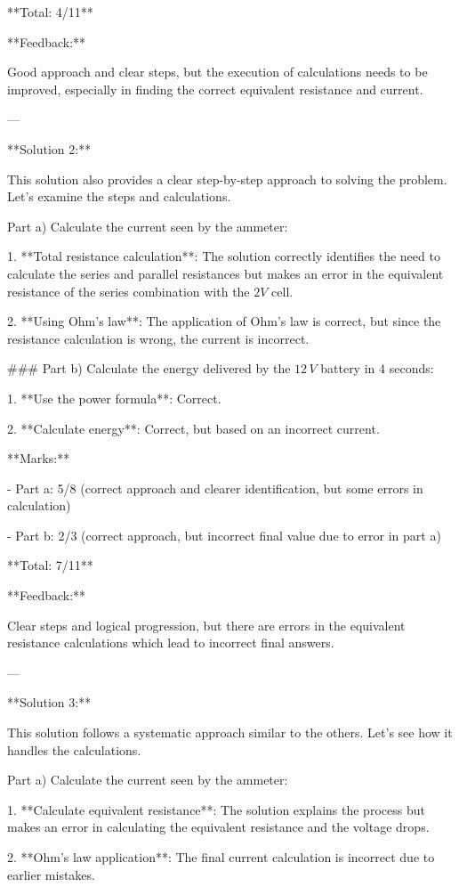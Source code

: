 \documentclass[a4paper,11pt]{article}
\begin{document}
**Total: 4/11**

**Feedback:**

Good approach and clear steps, but the execution of calculations needs to be improved, especially in finding the correct equivalent resistance and current.

---

**Solution 2:**

This solution also provides a clear step-by-step approach to solving the problem. Let's examine the steps and calculations.

Part a) Calculate the current seen by the ammeter:

1. **Total resistance calculation**: The solution correctly identifies the need to calculate the series and parallel resistances but makes an error in the equivalent resistance of the series combination with the \(2V\) cell.

2. **Using Ohm's law**: The application of Ohm's law is correct, but since the resistance calculation is wrong, the current is incorrect.

### Part b) Calculate the energy delivered by the \(12\,V\) battery in \(4\) seconds:

1. **Use the power formula**: Correct.

2. **Calculate energy**: Correct, but based on an incorrect current.

**Marks:**

- Part a: 5/8 (correct approach and clearer identification, but some errors in calculation)

- Part b: 2/3 (correct approach, but incorrect final value due to error in part a)

**Total: 7/11**

**Feedback:**

Clear steps and logical progression, but there are errors in the equivalent resistance calculations which lead to incorrect final answers.

---

**Solution 3:**

This solution follows a systematic approach similar to the others. Let's see how it handles the calculations.

Part a) Calculate the current seen by the ammeter:

1. **Calculate equivalent resistance**: The solution explains the process but makes an error in calculating the equivalent resistance and the voltage drops.

2. **Ohm's law application**: The final current calculation is incorrect due to earlier mistakes.
\end{document}
